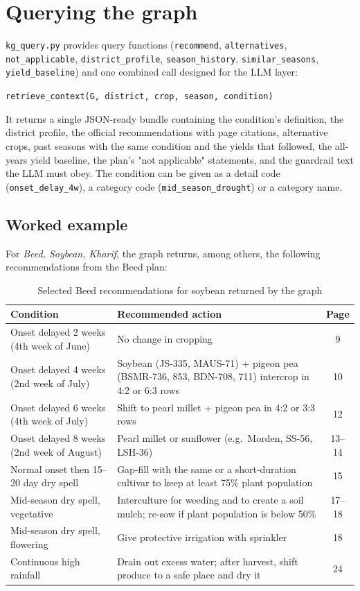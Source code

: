\section{Querying the graph}
\texttt{kg\_query.py} provides query functions (\texttt{recommend}, \texttt{alternatives}, \texttt{not\_applicable}, \texttt{district\_profile}, \texttt{season\_history}, \texttt{similar\_seasons}, \texttt{yield\_baseline}) and one combined call designed for the LLM layer:

\begin{center}
\texttt{retrieve\_context(G, district, crop, season, condition)}
\end{center}

It returns a single JSON-ready bundle containing the condition's definition, the district profile, the official recommendations with page citations, alternative crops, past seasons with the same condition and the yields that followed, the all-years yield baseline, the plan's "not applicable" statements, and the guardrail text the LLM must obey. The condition can be given as a detail code (\texttt{onset\_delay\_4w}), a category code (\texttt{mid\_season\_drought}) or a category name.

\subsection{Worked example}
For \emph{Beed, Soybean, Kharif}, the graph returns, among others, the following recommendations from the Beed plan:

\begin{table}[H]
	\centering
	\caption{Selected Beed recommendations for soybean returned by the graph}
	\label{tab:example}
	\small
	\begin{tabularx}{\textwidth}{p{4.2cm}Yc}
		\toprule
		\textbf{Condition} & \textbf{Recommended action} & \textbf{Page} \\
		\midrule
		Onset delayed 2 weeks (4th week of June) & No change in cropping & 9 \\
		Onset delayed 4 weeks (2nd week of July) & Soybean (JS-335, MAUS-71) + pigeon pea (BSMR-736, 853, BDN-708, 711) intercrop in 4:2 or 6:3 rows & 10 \\
		Onset delayed 6 weeks (4th week of July) & Shift to pearl millet + pigeon pea in 4:2 or 3:3 rows & 12 \\
		Onset delayed 8 weeks (2nd week of August) & Pearl millet or sunflower (e.g.\ Morden, SS-56, LSH-36) & 13--14 \\
		Normal onset then 15--20 day dry spell & Gap-fill with the same or a short-duration cultivar to keep at least 75\% plant population & 15 \\
		Mid-season dry spell, vegetative & Interculture for weeding and to create a soil mulch; re-sow if plant population is below 50\% & 17--18 \\
		Mid-season dry spell, flowering & Give protective irrigation with sprinkler & 18 \\
		Continuous high rainfall & Drain out excess water; after harvest, shift produce to a safe place and dry it & 24 \\
		\bottomrule
	\end{tabularx}
\end{table}

